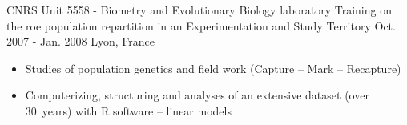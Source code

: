 \begin{cventries}
  \cventry
  {CNRS Unit 5558 - Biometry and Evolutionary Biology laboratory}
  {Training on the roe population repartition in an Experimentation and Study Territory}
  {Oct. 2007 - Jan. 2008}
    {Lyon, France}
{
  \begin{cvitems}
              \begin{itemize}[label=$\bullet$,topsep=2pt]
    \item {Studies of population genetics and field work (Capture – Mark – Recapture)}
    \item {Computerizing, structuring and analyses of an extensive dataset (over 30 years) with R software – linear models}
              \end{itemize}
\end{cvitems} 
  }
\end{cventries}
